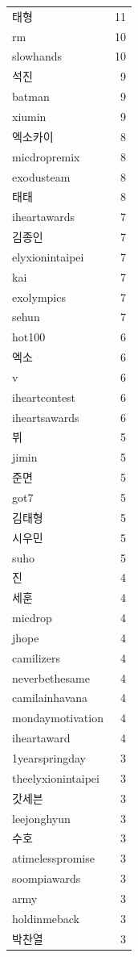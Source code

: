 \begin{tabular}{lr}
태형 & 11 \\
rm & 10 \\
slowhands & 10 \\
석진 & 9 \\
batman & 9 \\
xiumin & 9 \\
엑소카이 & 8 \\
micdropremix & 8 \\
exodusteam & 8 \\
태태 & 8 \\
iheartawards️ & 7 \\
김종인 & 7 \\
elyxionintaipei & 7 \\
kai & 7 \\
exolympics & 7 \\
sehun & 7 \\
hot100 & 6 \\
엑소 & 6 \\
v & 6 \\
iheartcontest & 6 \\
iheartsawards & 6 \\
뷔 & 5 \\
jimin & 5 \\
준면 & 5 \\
got7 & 5 \\
김태형 & 5 \\
시우민 & 5 \\
suho & 5 \\
진 & 4 \\
세훈 & 4 \\
micdrop & 4 \\
jhope & 4 \\
camilizers & 4 \\
neverbethesame & 4 \\
camilainhavana & 4 \\
mondaymotivation & 4 \\
iheartaward & 4 \\
1yearspringday & 3 \\
theelyxionintaipei & 3 \\
갓세븐 & 3 \\
leejonghyun & 3 \\
수호 & 3 \\
atimelesspromise & 3 \\
soompiawards & 3 \\
army & 3 \\
holdinmeback & 3 \\
박찬열 & 3 \\

\end{tabular}

